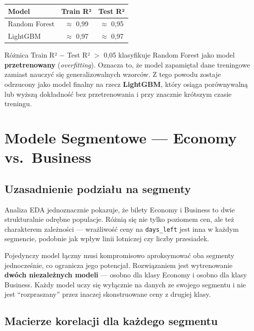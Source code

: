 \documentclass[12pt,a4paper]{article}
\begin{document}
	\begin{center}
		\begin{tabular}{lcc}
			\toprule
			\textbf{Model} & \textbf{Train R²} & \textbf{Test R²} \\
			\midrule
			Random Forest & $\approx$ 0,99 & $\approx$ 0,95 \\
			LightGBM      & $\approx$ 0,97 & $\approx$ 0,97 \\
			\bottomrule
		\end{tabular}
	\end{center}
	
	Różnica Train R² $-$ Test R² $>$ 0,05 klasyfikuje Random Forest jako model
	\textbf{przetrenowany} (\textit{overfitting}). Oznacza to, że model zapamiętał
	dane treningowe zamiast nauczyć się generalizowalnych wzorców. Z tego powodu
	zostaje odrzucony jako model finalny na rzecz \textbf{LightGBM}, który osiąga
	porównywalną lub wyższą dokładność bez przetrenowania i przy znacznie krótszym
	czasie treningu.
	
	\section{Modele Segmentowe --- Economy vs.\ Business}
	\label{sec:segmenty}
	
	\subsection{Uzasadnienie podziału na segmenty}
	
	Analiza EDA jednoznacznie pokazuje, że bilety Economy i Business to dwie
	strukturalnie odrębne populacje. Różnią się nie tylko poziomem cen, ale też
	charakterem zależności --- wrażliwość ceny na \texttt{days\_left} jest inna
	w każdym segmencie, podobnie jak wpływ linii lotniczej czy liczby przesiadek.
	
	Pojedynczy model łączny musi kompromisowo aproksymować oba segmenty jednocześnie,
	co ogranicza jego potencjał. Rozwiązaniem jest wytrenowanie \textbf{dwóch
		niezależnych modeli} --- osobno dla klasy Economy i osobno dla klasy Business.
	Każdy model uczy się wyłącznie na danych ze swojego segmentu i nie jest
	``rozpraszany'' przez inaczej skonstruowane ceny z drugiej klasy.
	
	\subsection{Macierze korelacji dla każdego segmentu}
	
\end{document}
